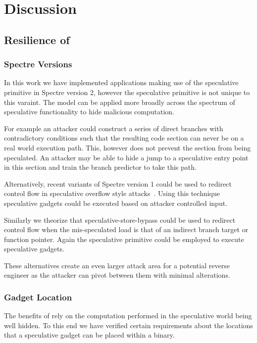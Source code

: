 
\section{Discussion}

\subsection{Resilience of \speculake}
%
\subsubsection{Spectre Versions}
In this work we have implemented applications making use of the speculative
primitive in Spectre version 2, however the speculative primitive is not 
unique to this varaint. The \speculake model can be applied more broadly
across the spectrum of speculative functionality to hide malicious computation.

For example an attacker could construct a series of direct branches with 
contradictory conditions such that the resulting code section can never 
be on a real world execution path.
This, however does not prevent the section from being speculated. An 
attacker may be able to hide a jump to a speculative entry point in 
this section and train the branch predictor to take this path. 

Alternatively, recent variants of Spectre version 1 could be used to
redirect control flow in speculative overflow style attacks~\cite{}. 
Using this technique speculative gadgets could be executed
based on attacker controlled input. 

Similarly we theorize that speculative-store-bypass could be used to
redirect control flow when the mis-speculated load is that of an indirect
branch target or function pointer. Again the speculative primitive could 
be employed to execute speculative gadgets. 

These alternatives create an even larger attack area for a potential 
reverse engineer as the attacker can pivot between them with minimal alterations. 

\subsubsection{Gadget Location}
The benefits of \speculake rely on the computation performed in the
speculative world being well hidden. To this end we have verified 
certain requirements about the locations that a speculative gadget can 
be placed within a binary. 

